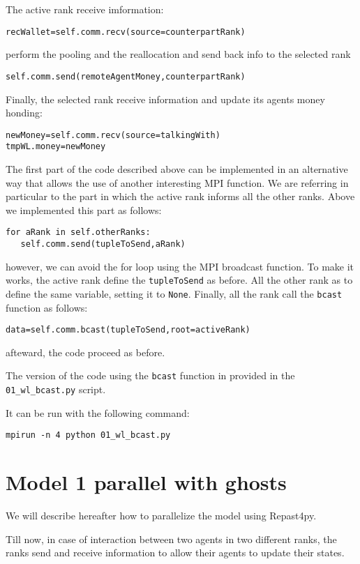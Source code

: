 \documentclass{article}
\begin{document}
The active rank receive imformation:
\begin{verbatim}
recWallet=self.comm.recv(source=counterpartRank)
\end{verbatim}
perform the pooling and the reallocation and send back info to the selected rank
\begin{verbatim}
self.comm.send(remoteAgentMoney,counterpartRank)
\end{verbatim}
Finally, the selected rank receive information and update its agents money honding:
\begin{verbatim}
newMoney=self.comm.recv(source=talkingWith)
tmpWL.money=newMoney
\end{verbatim}

The first part of the code described above can be implemented in an alternative way that allows the use of another interesting MPI function.
We are referring in particular to the part in which the active rank informs all the other ranks. Above we implemented this part as follows:
\begin{verbatim}
for aRank in self.otherRanks:
   self.comm.send(tupleToSend,aRank)
\end{verbatim}
however, we can avoid the for loop using the MPI broadcast function.
To make it works, the active rank define the \verb+tupleToSend+ as before. All the other rank as to define the same variable, setting it to \verb+None+.
Finally, all the rank call the \verb+bcast+ function as follows:
\begin{verbatim}
data=self.comm.bcast(tupleToSend,root=activeRank)
\end{verbatim}
afteward, the code proceed as before.

The version of the code using the \verb+bcast+ function in provided in the \verb+01_wl_bcast.py+ script.

It can be run with the following command:
\begin{verbatim}
mpirun -n 4 python 01_wl_bcast.py
\end{verbatim}

\section{Model 1 parallel with ghosts}

We will describe hereafter how to parallelize the model using Repast4py.

Till now, in case of interaction between two agents in two different ranks, the ranks send and receive information to allow their agents to update their states.
\end{document}
